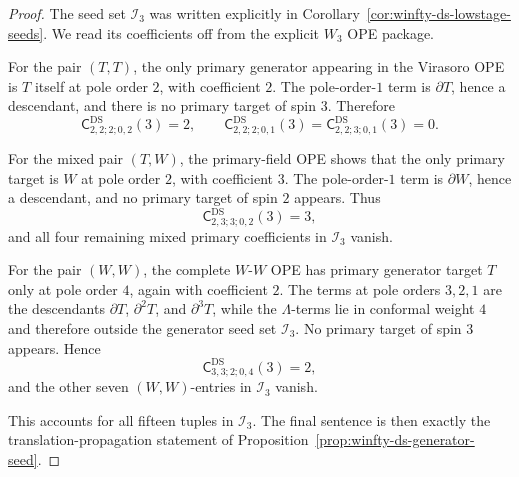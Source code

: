 \begin{proof}
The seed set $\mathcal{I}_3$ was written explicitly in
Corollary~\ref{cor:winfty-ds-lowstage-seeds}. We read its coefficients
off from the explicit $W_3$ OPE package.

For the pair $(T,T)$, the only primary generator appearing in the
Virasoro OPE is $T$ itself at pole order $2$, with coefficient $2$.
The pole-order-$1$ term is $\partial T$, hence a descendant, and there
is no primary target of spin $3$. Therefore
\[
\mathsf{C}^{\mathrm{DS}}_{2,2;2;0,2}(3)=2,
\qquad
\mathsf{C}^{\mathrm{DS}}_{2,2;2;0,1}(3)=
\mathsf{C}^{\mathrm{DS}}_{2,2;3;0,1}(3)=0.
\]

For the mixed pair $(T,W)$, the primary-field OPE shows that the only
primary target is $W$ at pole order $2$, with coefficient $3$. The
pole-order-$1$ term is $\partial W$, hence a descendant, and no primary
target of spin $2$ appears. Thus
\[
\mathsf{C}^{\mathrm{DS}}_{2,3;3;0,2}(3)=3,
\]
and all four remaining mixed primary coefficients in $\mathcal{I}_3$
vanish.

For the pair $(W,W)$, the complete $W$-$W$ OPE has primary generator
target $T$ only at pole order $4$, again with coefficient $2$. The
terms at pole orders $3,2,1$ are the descendants
$\partial T$, $\partial^2 T$, and $\partial^3 T$, while the
$\Lambda$-terms lie in conformal weight $4$ and therefore outside the
generator seed set $\mathcal{I}_3$. No primary target of spin $3$
appears. Hence
\[
\mathsf{C}^{\mathrm{DS}}_{3,3;2;0,4}(3)=2,
\]
and the other seven $(W,W)$-entries in $\mathcal{I}_3$ vanish.

This accounts for all fifteen tuples in $\mathcal{I}_3$. The final
sentence is then exactly the translation-propagation statement of
Proposition~\ref{prop:winfty-ds-generator-seed}.
\end{proof}

